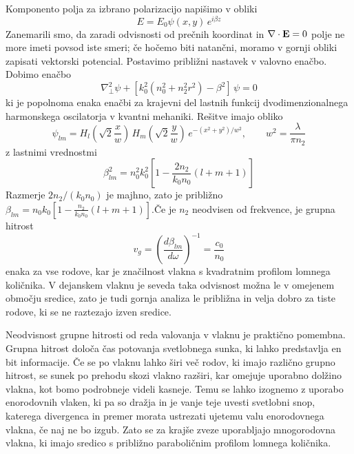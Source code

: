 \documentclass[11pt,fleqn]{book} %
\begin{document}
Komponento polja za izbrano polarizacijo napišimo v obliki 
\begin{equation}
E=E_{0}\psi(x,y)\, e^{i\beta z}\label{9.16}
\end{equation}
 Zanemarili smo, da zaradi odvisnosti od prečnih koordinat in $\nabla\cdot{\bf E}=0$
polje ne more imeti povsod iste smeri; če hočemo biti natančni, moramo
v gornji obliki zapisati vektorski potencial. Postavimo približni
nastavek v valovno enačbo. Dobimo enačbo 
\begin{equation}
\nabla_{\perp}^{2}\psi+\left[k_{0}^{2}\left(n_{0}^{2}+n_{2}^{2}r^{2}\right)-\beta^{2}\right]\,\psi=0\label{9.17}
\end{equation}
 ki je popolnoma enaka enačbi za krajevni del lastnih funkcij dvodimenzionalnega
harmonskega oscilatorja v kvantni mehaniki. Rešitve imajo obliko 
\begin{equation}
\psi_{lm}=H_{l}\left(\sqrt{2}\frac{x}{w}\right)\, H_{m}\left(\sqrt{2}\frac{y}{w}\right)\, e^{-(x^{2}+y^{2})/w^{2}},\qquad w^{2}=\frac{\lambda}{\pi n_{2}}\label{9.18}
\end{equation}
 z lastnimi vrednostmi 
\begin{equation}
\beta_{lm}^{2}=n_{0}^{2}k_{0}^{2}\left[1-\frac{2n_{2}}{k_{0}n_{0}}\left(l+m+1\right)\right]\label{9.19}
\end{equation}
 Razmerje $2n_{2}/\left(k_{0}n_{0}\right)$ je majhno, zato je približno
$\beta_{lm}=n_{0}k_{0}\left[1-\frac{n_{2}}{k_{0}n_{0}}\left(l+m+1\right)\right].$Če
je $n_{2}$ neodvisen od frekvence, je grupna hitrost 
\begin{equation}
v_{g}=\left(\frac{d\beta_{lm}}{d\omega}\right)^{-1}=\frac{c_{0}}{n_{0}}\label{9.21}
\end{equation}
 enaka za vse rodove, kar je značilnost vlakna s kvadratnim profilom
lomnega količnika. V dejanskem vlaknu je seveda taka odvisnost možna
le v omejenem območju sredice, zato je tudi gornja analiza le približna
in velja dobro za tiste rodove, ki se ne raztezajo izven sredice.

Neodvisnost grupne hitrosti od reda valovanja v vlaknu je praktično
pomembna. Grupna hitrost določa čas potovanja svetlobnega sunka, ki
lahko predstavlja en bit informacije. Če se po vlaknu lahko širi več
rodov, ki imajo različno grupno hitrost, se sunek po prehodu skozi
vlakno razširi, kar omejuje uporabno dolžino vlakna, kot bomo podrobneje
videli kasneje. Temu se lahko izognemo z uporabo enorodovnih vlaken,
ki pa so dražja in je vanje te\textquotedbl{}je uvesti svetlobni snop,
katerega divergenca in premer morata ustrezati ujetemu valu enorodovnega
vlakna, če naj ne bo izgub. Zato se za krajše zveze uporabljajo mnogorodovna
vlakna, ki imajo sredico s približno paraboličnim profilom lomnega
količnika.
\end{document}
